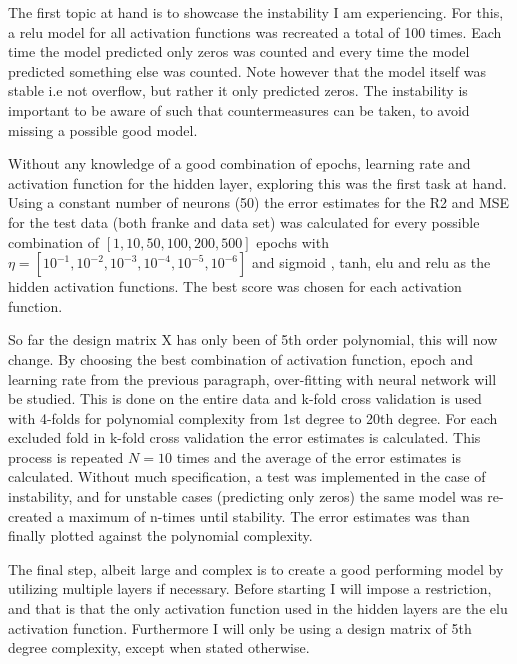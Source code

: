 \documentclass[uio,jmp,amsmath,amssymb,reprint,nofootinbib]{revtex4-1}
\numberwithin{equation}{section}
\begin{document}
The first topic at hand is to showcase the instability I am experiencing. For this, a relu model for all activation functions was recreated a total of 100 times. Each time the model predicted only zeros was counted and every time the model predicted something else was counted. Note however that the model itself was stable i.e not overflow, but rather it only predicted zeros. The instability is important to be aware of such that countermeasures can be taken, to avoid missing a possible good model.

Without any knowledge of a good combination of epochs, learning rate and activation function for the hidden layer, exploring this was the first task at hand. Using a constant number of neurons (50) the error estimates for the R2 and MSE for the test data (both franke and data set) was calculated for every possible combination of \([1, 10, 50, 100, 200, 500]\) epochs with \(\eta = [10^{-1}, 10^{-2}, 10^{-3}, 10^{-4}, 10^{-5}, 10^{-6}]\) and sigmoid , tanh, elu and relu as the hidden activation functions. The best score was chosen for each activation function.

So far the design matrix X has only been of 5th order polynomial, this will now change. By choosing the best combination of activation function, epoch and learning rate from the previous paragraph, over-fitting with neural network will be studied. This is done on the entire data and k-fold cross validation is used with 4-folds for polynomial complexity from 1st degree to 20th degree. For each excluded fold in k-fold cross validation the error estimates is calculated. This process is repeated \(N=10\) times and the average of the error estimates is calculated. Without much specification, a test was implemented in the case of instability, and for unstable cases (predicting only zeros) the same model was re-created a maximum of n-times until stability. The error estimates was than finally plotted against the polynomial complexity.

The final step, albeit large and complex is to create a good performing model by utilizing multiple layers if necessary. Before starting I will impose a restriction, and that is that the only activation function used in the hidden layers are the elu activation function. Furthermore I will only be using a design matrix of 5th degree complexity, except when stated otherwise.
\end{document}
